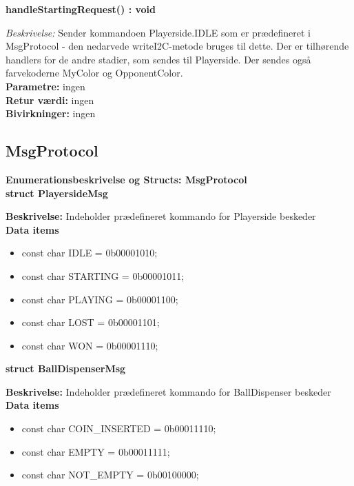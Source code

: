 \documentclass[Softwaredesign/Softwaredesign_main.tex]{subfiles}
\begin{document}
\textbf{handleStartingRequest() : void}
\begin{adjustwidth}{1cm}{0pt}
\textit{Beskrivelse:} Sender kommandoen Playerside.IDLE som er prædefineret i MsgProtocol - den nedarvede writeI2C-metode bruges til dette. Der er tilhørende handlers for de andre stadier, som sendes til Playerside. Der sendes også farvekoderne MyColor og OpponentColor. \\[0.2cm]
\textbf{Parametre:} ingen \\[0.2cm]
\textbf{Retur værdi:} ingen \\[0.2cm]
\textbf{Bivirkninger:} ingen \\[0.2cm]
\end{adjustwidth}

\subsection{MsgProtocol}
{\large\textbf{Enumerationsbeskrivelse og Structs: MsgProtocol}}\\[0.2cm]
\textbf{struct PlayersideMsg}
\begin{adjustwidth}{1cm}{0pt}
\textbf{Beskrivelse:} Indeholder prædefineret kommando for Playerside beskeder \\[0.2cm]
\textbf{Data items}
\begin{itemize}
    \item const char IDLE = 0b00001010;
    \item const char STARTING = 0b00001011;
    \item const char PLAYING = 0b00001100;
    \item const char LOST = 0b00001101;
    \item const char WON = 0b00001110;
\end{itemize}
\end{adjustwidth}

\textbf{struct BallDispenserMsg}
\begin{adjustwidth}{1cm}{0pt}
\textbf{Beskrivelse:} Indeholder prædefineret kommando for BallDispenser beskeder \\[0.2cm]
\textbf{Data items}
\begin{itemize}
    \item const char COIN\_INSERTED = 0b00011110;
    \item const char EMPTY = 0b00011111;
    \item const char NOT\_EMPTY = 0b00100000;
\end{itemize}
\end{adjustwidth}
\end{document}
